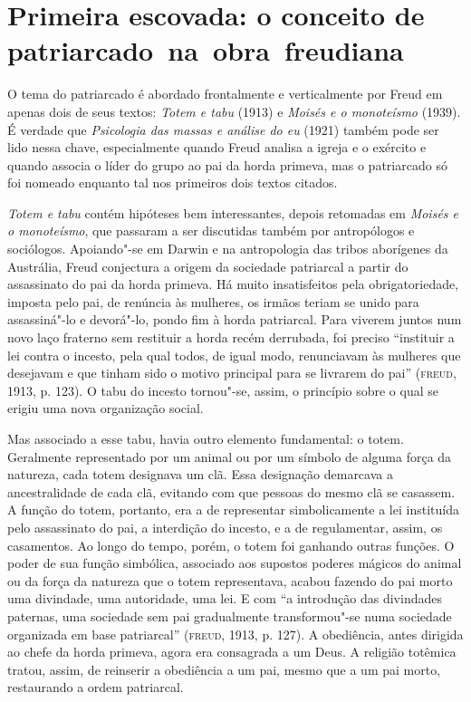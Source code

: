 \section{Primeira escovada: o conceito de patriarcado~na~obra~freudiana}

O tema do patriarcado é abordado frontalmente e verticalmente por Freud
em apenas dois de seus textos: \emph{Totem e tabu} (1913) e \emph{Moisés e o
monoteísmo} (1939). É verdade que \emph{Psicologia das massas e análise do eu} (1921)
também pode ser lido nessa chave, especialmente quando Freud analisa a
igreja e o exército e quando associa o líder do grupo ao pai da horda
primeva, mas o patriarcado só foi nomeado enquanto tal nos primeiros dois
textos citados.

\emph{Totem e tabu} contém hipóteses bem interessantes, depois retomadas
em \emph{Moisés e o monoteísmo}, que passaram a ser discutidas também
por antropólogos e sociólogos. Apoiando"-se em Darwin e na antropologia
das tribos aborígenes da Austrália, Freud conjectura a origem da
sociedade patriarcal a partir do assassinato do pai da horda primeva. Há
muito insatisfeitos pela obrigatoriedade, imposta pelo pai, de renúncia
às mulheres, os irmãos teriam se unido para assassiná"-lo e devorá"-lo,
pondo fim à horda patriarcal. Para viverem juntos num novo laço fraterno
sem restituir a horda recém derrubada, foi preciso ``instituir a lei
contra o incesto, pela qual todos, de igual modo, renunciavam às
mulheres que desejavam e que tinham sido o motivo principal para se
livrarem do pai'' (\textsc{freud}, 1913, p. 123). O tabu do incesto tornou"-se,
assim, o princípio sobre o qual se erigiu uma nova organização social.

Mas associado a esse tabu, havia outro elemento fundamental: o totem.
Geralmente representado por um animal ou por um símbolo de alguma força
da natureza, cada totem designava um clã. Essa designação demarcava a
ancestralidade de cada clã, evitando com que pessoas do mesmo clã se
casassem. A função do totem, portanto, era a de representar
simbolicamente a lei instituída pelo assassinato do pai, a interdição do
incesto, e a de regulamentar, assim, os casamentos. Ao longo do tempo,
porém, o totem foi ganhando outras funções. O poder de sua função
simbólica, associado aos supostos poderes mágicos do animal ou da força
da natureza que o totem representava, acabou fazendo do pai morto uma
divindade, uma autoridade, uma lei. E com ``a introdução das divindades
paternas, uma sociedade sem pai gradualmente transformou"-se numa
sociedade organizada em base patriarcal'' (\textsc{freud}, 1913, p. 127). A
obediência, antes dirigida ao chefe da horda primeva, agora era
consagrada a um Deus. A religião totêmica tratou, assim, de reinserir a
obediência a um pai, mesmo que a um pai morto, restaurando a ordem
patriarcal.

